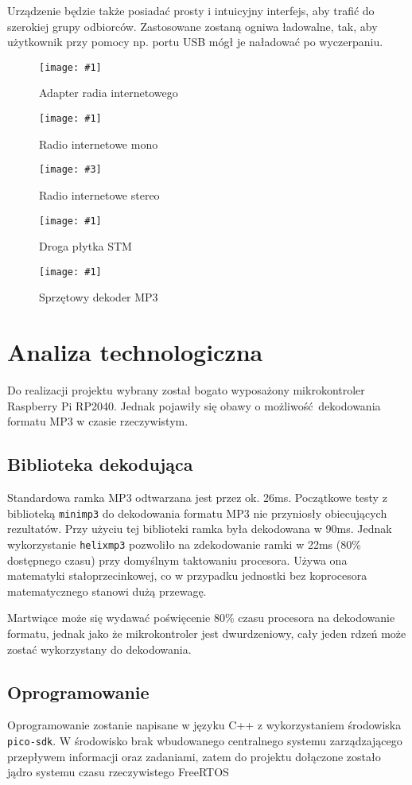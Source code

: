 \documentclass[12pt]{report}
\newcommand{\imgcs}[3]{
	\begin{figure}
		\centering
		\texttt{[image: \#1]}
		\caption{#2}
		\label{#1}
	\end{figure}
}
\newcommand{\img}[2]{\imgcs{#1}{#2}{0.7}}
\newcommand{\imgss}[4]{
	\begin{figure}
		\centering
		\begin{minipage}{.45\textwidth}
			\centering
			\texttt{[image: \#1]}
			\caption{#2}
			\label{#1}
		\end{minipage}%
		\hfill
		\begin{minipage}{.45\textwidth}
			\centering
			\texttt{[image: \#3]}
			\caption{#4}
			\label{#3}
		\end{minipage}
	\end{figure}
}
\begin{document}
		Urządzenie będzie także posiadać prosty i intuicyjny interfejs, aby trafić do szerokiej grupy odbiorców. Zastosowane zostaną ogniwa ładowalne, tak, aby użytkownik przy pomocy np. portu USB mógł je naładować po wyczerpaniu.
		
		\img{1/radio_adapter}{Adapter radia internetowego \textsuperscript{\cite{radio_adapter}}}
		\imgss{1/radio_tanie}{Radio internetowe mono \textsuperscript{\cite{radio_tanie}}}{1/radio_drogie}{Radio internetowe stereo \textsuperscript{\cite{radio_drogie}}}
		
		\img{1/botland_stm}{Droga płytka STM\textsuperscript{\cite{botland_stm}}}
		
		\img{1/radio_mp3}{Sprzętowy dekoder MP3 \textsuperscript{\cite{radio_vs1003}}}
		
	\section{Analiza technologiczna}
		Do realizacji projektu wybrany został bogato wyposażony mikrokontroler Raspberry Pi RP2040\textsuperscript{\cite{rp2040}}. Jednak pojawiły się obawy o możliwość dekodowania formatu MP3 w czasie rzeczywistym.
		
		\subsection{Biblioteka dekodująca}
			Standardowa ramka MP3 odtwarzana jest przez ok. 26ms. Początkowe testy z biblioteką \lstinline|minimp3|\textsuperscript{\cite{minimp3}} do dekodowania formatu MP3 nie przyniosły obiecujących rezultatów.  Przy użyciu tej biblioteki ramka była dekodowana w 90ms. Jednak wykorzystanie \lstinline|helixmp3|\textsuperscript{\cite{helixmp3}} pozwoliło na zdekodowanie ramki w 22ms (80\% dostępnego czasu) przy domyślnym taktowaniu procesora.  Używa ona matematyki stałoprzecinkowej, co w przypadku jednostki bez koprocesora matematycznego stanowi dużą przewagę.
			
			Martwiące może się wydawać poświęcenie 80\% czasu procesora na dekodowanie formatu, jednak jako że mikrokontroler jest dwurdzeniowy, cały jeden rdzeń może zostać wykorzystany do dekodowania.
		
		\subsection{Oprogramowanie}
			Oprogramowanie zostanie napisane w języku C++ z wykorzystaniem środowiska \lstinline|pico-sdk|\textsuperscript{\cite{pico_sdk}}.  W środowisko brak wbudowanego centralnego systemu zarządzającego przepływem informacji oraz zadaniami, zatem do projektu dołączone zostało jądro systemu czasu rzeczywistego FreeRTOS\textsuperscript{\cite{freertos_kernel}}
	
\end{document}
